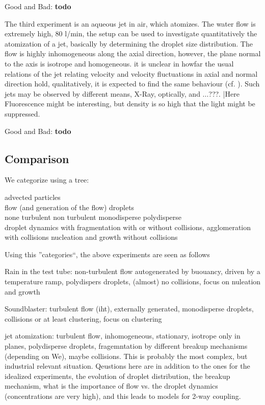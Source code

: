 \documentclass{report}
\begin{document}
Good 
and
Bad:
{\bf \color{red}todo}

The third experiment is an aqueous jet in air, which atomizes. The water flow 
is extremely high, 80 l/min, the setup can be used to investigate quantitatively
the atomization of a jet, basically by determining the droplet size distribution.
The flow is highly inhomogeneous along the axial direction, however, the plane normal
to the axis is isotrope and homogeneous. it is unclear in howfar the usual relations
of the jet relating velocity and velocity fluctuations in axial and normal direction
hold, qualitatively, it is expected to find the same behaviour (cf. \cite{Pope-2001}).
Such jets may be observed by different means, X-Ray, optically, and ...???.
|Here Fluorescence might be interesting, but density is so high that the light might 
be suppressed.


Good 
and
Bad:
{\bf \color{red}todo}

\subsection{Comparison}

We categorize using a tree:

advected particles \\
flow (and generation of the flow)			droplets\\
none turbulent non turbulent		monodisperse 	polydisperse\\                   

droplet dynamics with 
fragmentation with or without collisions, agglomeration with collisions
nucleation and growth without collisions

Using this ''categories``, the above experiments are seen as follows

Rain in the test tube: non-turbulent flow autogenerated by buouancy, driven 
by a temperature ramp, polydispers droplets, (almost) no collisions, focus on nuleation 
and growth

Soundblaster: turbulent flow (iht), externally generated, monodisperse droplets, collisions or at least 
clustering, focus on clustering

jet atomization: turbulent flow, inhomogeneous, stationary, isotrope only in planes, 
polydisperse droplets, fragemntation by different breakup mechanisms (depending on We),
maybe collisions. This is probably the most complex, but industrial relevant situation.
Qeustions here are in addition to the ones for the idealized experiments, the evolution of 
droplet distribution, the breakup mechanism, what is the importance of 
flow vs. the droplet dynamics (concentrations are very high),
and this leads to models for 2-way coupling.
\end{document}
